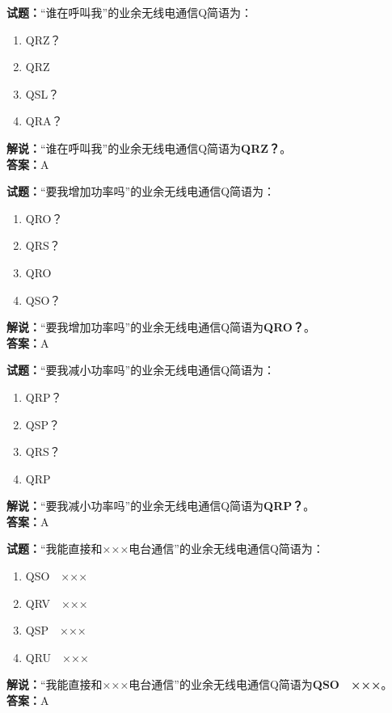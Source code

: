 \documentclass{ctexbook}
\begin{document}
\bigskip


\noindent\textbf{试题：}“谁在呼叫我”的业余无线电通信Q简语为：
\begin{enumerate}[leftmargin=3em]
\item QRZ？
\item QRZ
\item QSL？
\item QRA？
\end{enumerate}
\noindent\textbf{解说：}“谁在呼叫我”的业余无线电通信Q简语为\textbf{QRZ？}。\\\noindent\textbf{答案：}A

\bigskip


\noindent\textbf{试题：}“要我增加功率吗”的业余无线电通信Q简语为：
\begin{enumerate}[leftmargin=3em]
\item QRO？
\item QRS？
\item QRO
\item QSO？
\end{enumerate}
\noindent\textbf{解说：}“要我增加功率吗”的业余无线电通信Q简语为\textbf{QRO？}。\\\noindent\textbf{答案：}A


\bigskip


\noindent\textbf{试题：}“要我减小功率吗”的业余无线电通信Q简语为：
\begin{enumerate}[leftmargin=3em]
\item QRP？
\item QSP？
\item QRS？
\item QRP
\end{enumerate}
\noindent\textbf{解说：}“要我减小功率吗”的业余无线电通信Q简语为\textbf{QRP？}。\\\noindent\textbf{答案：}A


\bigskip


\noindent\textbf{试题：}“我能直接和×××电台通信”的业余无线电通信Q简语为：
\begin{enumerate}[leftmargin=3em]
\item QSO　×××
\item QRV　×××
\item QSP　×××
\item QRU　×××
\end{enumerate}
\noindent\textbf{解说：}“我能直接和×××电台通信”的业余无线电通信Q简语为\textbf{QSO　×××}。\\\noindent\textbf{答案：}A


\bigskip
\end{document}
